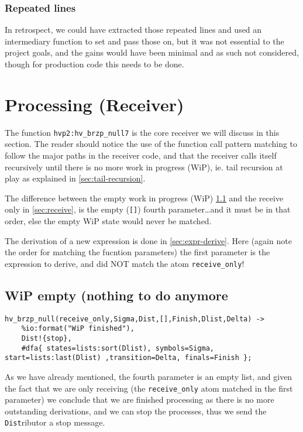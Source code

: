 \subsubsection{Repeated lines}

In retrospect, we could have extracted those repeated lines and used an
intermediary function to set and pass those on, but it was not
essential to the project goals, and the gains would have been minimal
and as such not considered, though for production code this needs to
be done.


\section{Processing (Receiver)}
\label{sec:proc_receiver}

The function \texttt{hvp2:hv\_brzp\_null\/7} is the core receiver we
will discuss in this section. The reader should notice the use
of the function call pattern matching to follow the major paths in
the receiver code, and that the receiver calls itself recursively
until there is no more work in progress (WiP),
ie. tail recursion at play as explained in \ref{sec:tail-recursion}.

The difference between the empty work in progress (WiP)
\ref{sec:wip-empty} and the receive only in \ref{sec:receive}, is the
empty (\texttt{[]}) fourth parameter\ldots and it must be in that
order, else the empty WiP state would never be matched.

The derivation of a new expression is done in
\ref{sec:expr-derive}. Here (again note the order for matching the
fucntion parameters) the first parameter is the expression to derive,
and did NOT match the atom \texttt{receive\_only}!

\subsection{WiP empty (nothing to do anymore}
\label{sec:wip-empty}

\begin{lstlisting}[name=hvp2]
%The case when the WiP is empty
hv_brzp_null(receive_only,Sigma,Dist,[],Finish,Dlist,Delta) ->
	%io:format("WiP finished"), 
	Dist!{stop},
	#dfa{ states=lists:sort(Dlist), symbols=Sigma, start=lists:last(Dlist) ,transition=Delta, finals=Finish };
\end{lstlisting}
As we have already mentioned, the fourth parameter is an empty list,
and given the fact that we are only receiving (the
\texttt{receive\_only} atom matched in the first parameter) we conclude
that we are finished processing as there is no more outstanding
derivations, and we can stop the processes, thus we send the
\texttt{Dist}ributor a stop message.

